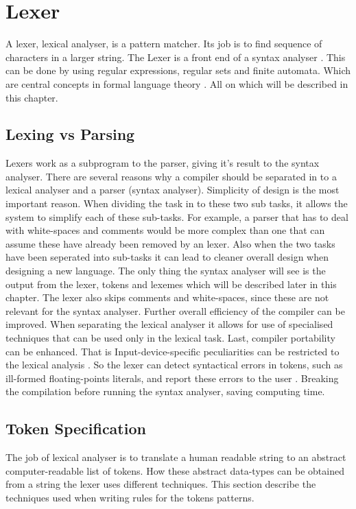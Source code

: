 \chapter{Lexer}
A lexer, lexical analyser, is a pattern matcher. Its job is to find sequence 
of characters in a larger string. The Lexer is a front end of a syntax 
analyser \cite{sebesta2012}.
This can be done by using regular expressions, regular sets and finite
automata. Which are central concepts in formal language theory \cite{Aho1990}.
All on which will be described in this chapter.

\section{Lexing vs Parsing}
Lexers work as a subprogram to the parser, giving it's result to the syntax 
analyser.
There are several reasons why a compiler should be separated in to a lexical 
analyser and a parser (syntax analyser). Simplicity of design is the most
important reason. When dividing the task in to these two sub tasks, it allows the
system to simplify each of these sub-tasks. For example, a parser that has to 
deal with white-spaces and comments would be more complex 
than one that can assume these have already been removed by 
an lexer. Also when the two tasks have been seperated into sub-tasks it can lead to 
cleaner overall design when designing a new language.
The only thing the syntax analyser will see is the output from the 
lexer, tokens and lexemes which will be described later in this chapter.
The lexer also skips comments and white-spaces, since these are not relevant 
for the syntax analyser.
Further overall efficiency of the compiler can be improved. When separating the 
lexical analyser it allows for use of specialised techniques that can be used 
only in the lexical task.
Last, compiler portability can be enhanced. That is Input-device-specific 
peculiarities can be restricted to the lexical analysis \cite{Aho2006}.
So the lexer can detect syntactical errors in tokens, such as ill-formed 
floating-points literals, and report these errors to the user \cite{sebesta2012}.
Breaking the compilation before running the syntax analyser, 
saving computing time. 
\section{Token Specification}
The job of lexical analyser is to translate a human readable string to an abstract 
computer-readable list of tokens. How these abstract data-types can be obtained
from a string the lexer uses different techniques. This section describe the
techniques used when writing rules for the tokens patterns. 
